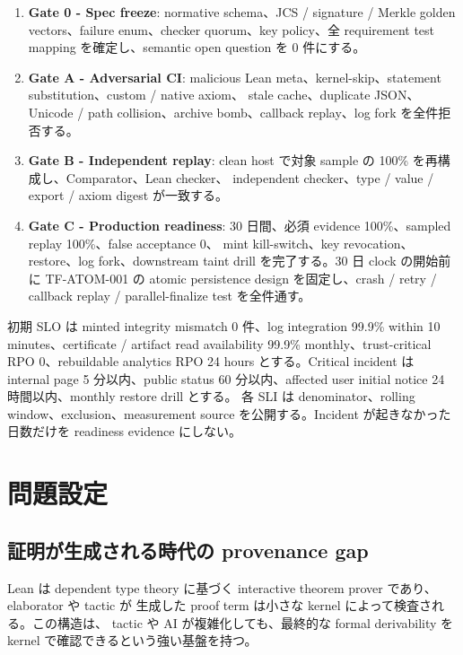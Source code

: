\documentclass[a4paper,11pt]{ltjsarticle}
\newcommand{\term}[1]{\textbf{\color{TFNavy}#1}}
\begin{document}
\begin{enumerate}
  \item \term{Gate 0 - Spec freeze}: normative schema、JCS / signature / Merkle golden vectors、failure enum、checker
        quorum、key policy、全 requirement test mapping を確定し、semantic open question を 0 件にする。
  \item \term{Gate A - Adversarial CI}: malicious Lean meta、kernel-skip、statement substitution、custom / native axiom、
        stale cache、duplicate JSON、Unicode / path collision、archive bomb、callback replay、log fork を全件拒否する。
  \item \term{Gate B - Independent replay}: clean host で対象 sample の 100\% を再構成し、Comparator、Lean checker、
        independent checker、type / value / export / axiom digest が一致する。
  \item \term{Gate C - Production readiness}: 30 日間、必須 evidence 100\%、sampled replay 100\%、false acceptance 0、
        mint kill-switch、key revocation、restore、log fork、downstream taint drill を完了する。30 日 clock の開始前に
        TF-ATOM-001 の atomic persistence design を固定し、crash / retry / callback replay / parallel-finalize test を全件通す。
\end{enumerate}

初期 SLO は minted integrity mismatch 0 件、log integration 99.9\% within 10 minutes、certificate / artifact read
availability 99.9\% monthly、trust-critical RPO 0、rebuildable analytics RPO 24 hours とする。Critical incident は internal
page 5 分以内、public status 60 分以内、affected user initial notice 24 時間以内、monthly restore drill とする。
各 SLI は denominator、rolling window、exclusion、measurement source を公開する。Incident が起きなかった日数だけを
readiness evidence にしない。

\section{問題設定}

\subsection{証明が生成される時代の provenance gap}

Lean は dependent type theory に基づく interactive theorem prover であり、elaborator や tactic が
生成した proof term は小さな kernel によって検査される\cite{leanref,leankernel}。この構造は、
tactic や AI が複雑化しても、最終的な formal derivability を kernel で確認できるという強い基盤を持つ。
\end{document}
